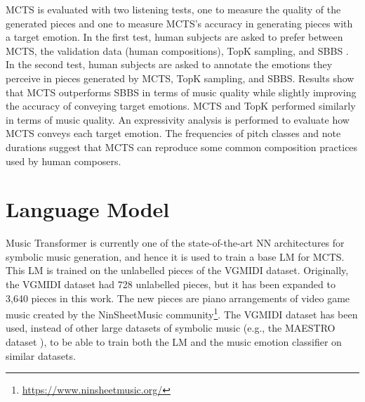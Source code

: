 MCTS is evaluated with two listening tests, one to measure the quality of the generated pieces and one to measure MCTS's accuracy in generating pieces with a target emotion. In the first test, human subjects are asked to prefer between MCTS, the validation data (human compositions), TopK sampling, and SBBS \cite{ferreira2020computer}. In the second test, human subjects are asked to annotate the emotions they perceive in pieces generated by MCTS, TopK sampling, and SBBS. Results show that MCTS outperforms SBBS in terms of music quality while slightly improving the accuracy of conveying target emotions. MCTS and TopK performed similarly in terms of music quality. An expressivity analysis \cite{smith2010analyzing} is performed to evaluate how MCTS conveys each target emotion. The frequencies of pitch classes and note durations suggest that MCTS can reproduce some common composition practices used by human composers.



\section{Language Model}

Music Transformer \cite{huang2018music} is currently one of the state-of-the-art NN architectures for symbolic music generation, and hence it is used to train a base LM for MCTS. This LM is trained on the unlabelled pieces of the VGMIDI dataset. Originally, the VGMIDI dataset had 728 unlabelled pieces, but it has been expanded to 3,640 pieces in this work. The new pieces are piano arrangements of video game music created by the NinSheetMusic community\footnote{\url{https://www.ninsheetmusic.org/}}. The VGMIDI dataset has been used, instead of other large datasets of symbolic music (e.g., the MAESTRO dataset \cite{hawthorne2018enabling}), to be able to train both the LM and the music emotion classifier on similar datasets.

